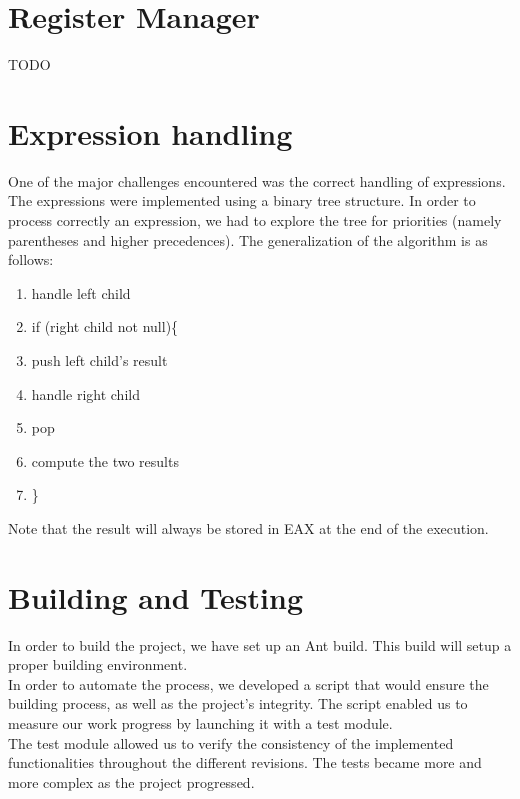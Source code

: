 \documentclass{article}
\begin{document}
\section{Register Manager}
TODO

\section{Expression handling}
One of the major challenges encountered was the correct handling of expressions.
The expressions were implemented using a binary tree structure. In order to process correctly an expression, we had to explore the tree for priorities (namely parentheses and higher precedences). The generalization of the algorithm is as follows:

\begin{enumerate}
\item handle left child
\item if (right child not null)\{
\item   push left child's result
\item   handle right child
\item   pop
\item   compute the two results
\item \}
\end{enumerate}

Note that the result will always be stored in EAX at the end of the execution.

\section{Building and Testing}
In order to build the project, we have set up an Ant build. This build will setup a proper building environment.\\
In order to automate the process, we developed a script that would ensure the building process, as well as the project's integrity. The script enabled us to measure our work progress by launching it with a test module.\\
The test module allowed us to verify the consistency of the implemented functionalities throughout the different revisions. The tests became more and more complex as the project progressed.
\end{document}
